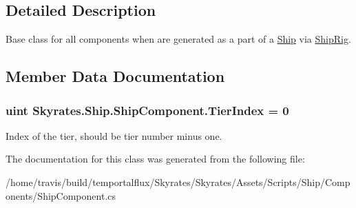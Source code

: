 \subsection{Detailed Description}
Base class for all components when are generated as a part of a \hyperlink{namespace_skyrates_1_1_ship}{Ship} via \hyperlink{class_skyrates_1_1_ship_1_1_ship_rig}{Ship\-Rig}. 



\subsection{Member Data Documentation}
\hypertarget{class_skyrates_1_1_ship_1_1_ship_component_acb8438da55bb68dfc713c4f340627097}{
\subsubsection[{Tier\-Index}]{\setlength{\rightskip}{0pt plus 5cm}uint Skyrates.\-Ship.\-Ship\-Component.\-Tier\-Index = 0}}\label{class_skyrates_1_1_ship_1_1_ship_component_acb8438da55bb68dfc713c4f340627097}


Index of the tier, should be tier number minus one. 



The documentation for this class was generated from the following file\-:\begin{DoxyCompactItemize}
\item 
/home/travis/build/temportalflux/\-Skyrates/\-Skyrates/\-Assets/\-Scripts/\-Ship/\-Components/Ship\-Component.\-cs\end{DoxyCompactItemize}
